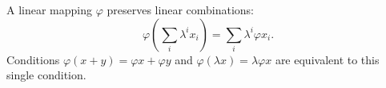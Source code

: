 A linear mapping $\varphi$ preserves linear combinations:
$$\varphi\!\left(\sum_i \lambda^i x_i\right) = \sum_i \lambda^i \varphi x_i.$$
Conditions $\varphi(x+y) = \varphi x + \varphi y$ and $\varphi(\lambda x) = \lambda \varphi x$ are equivalent to this single condition.
